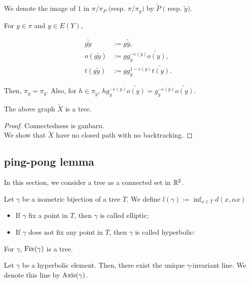 We denote the image of $1$ in $\pi/\pi_P \; ($resp. $\pi/\pi_y)$ by $\tilde{P} \; ($ resp. $\tilde{y})$. 

For $g \in \pi$ and $y \in E(Y)$,

\begin{align*}
  \overline{g \tilde{y}} &:= g \tilde{\overline{y}}, \\
  o(g\tilde{y}) &:= g g_y^{-e(y)}\tilde{o(y)}, \\
  t(g \tilde{y}) &:= g g_y^{1-e(y)}\tilde{t(y)}.
\end{align*}

Then, $\pi_y = \pi_{\overline{y}}$.
Also, for $h \in \pi_{\tilde{y}}$,
$h g_y^{-e(y)}\tilde{o(y)} = g_y^{-e(y)}\tilde{o(y)}$.

\begin{theorem}
  The above graph $\tilde{X}$ is a tree.
\end{theorem}

\begin{proof}
  Connectedness is ganbaru. \\
  We show that $\tilde{X}$ have no closed path with no backtracking.
 
\end{proof}

\subsection{ping-pong lemma}

In this section, we consider a tree as a connected set in $\mathbb{R}^2$.

\begin{definition}
  Let $\gamma$ be a isometric bijection of a tree $T$.
  We define $l(\gamma) := \inf_{x \in T} d(x,\alpha x)$
  \begin{itemize}
    \item If $\gamma$ fix a point in $T$, then $\gamma$ is called elliptic;
    \item If $\gamma$ does not fix any point in $T$, then $\gamma$ is called hyperbolic:
  \end{itemize}
      
\end{definition}

\begin{remark}
  For $\gamma$, ${\rm Fix}(\gamma)$ is a tree.
\end{remark}

\begin{proposition}
  Let $\gamma$ be a hyperbolic element.
  Then, there exist the unique $\gamma$-invariant line.
  We denote this line by ${\rm Axis}(\gamma)$. 
\end{proposition}

